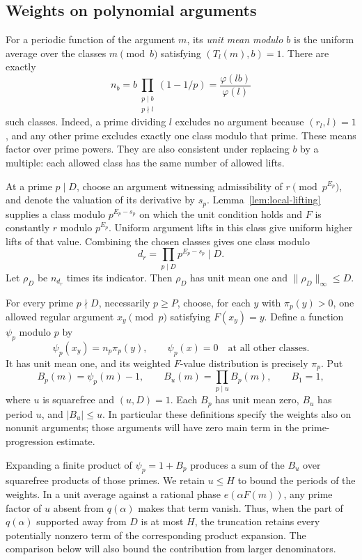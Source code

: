 \subsection{Weights on polynomial arguments}

For a periodic function of the argument $m$, its \emph{unit mean modulo
$b$} is the uniform average over the classes $m\pmod b$ satisfying
$(T_l(m),b)=1$.  There are exactly
\begin{equation}\label{eq:unit-mean-count}
 n_b=b\prod_{\substack{p\mid b\\p\nmid l}}(1-1/p)
     =\frac{\varphi(lb)}{\varphi(l)}
\end{equation}
such classes.  Indeed, a prime dividing $l$ excludes no argument because
$(r_l,l)=1$, and any other prime excludes exactly one class modulo that
prime.  These means factor over prime powers.  They are also consistent
under replacing $b$ by a multiple: each allowed class has the same number
of allowed lifts.

At a prime $p\mid D$, choose an argument witnessing admissibility of
$r\pmod {p^{E_p}}$, and denote the valuation of its derivative by $s_p$.
Lemma~\ref{lem:local-lifting} supplies a class modulo $p^{E_p-s_p}$ on
which the unit condition holds and $F$ is constantly $r$ modulo
$p^{E_p}$.  Uniform argument lifts in this class give uniform higher
lifts of that value.  Combining the chosen classes gives one class modulo
\[
 d_r=\prod_{p\mid D}p^{E_p-s_p}\mid D.
\]
Let $\rho_D$ be $n_{d_r}$ times its indicator.  Then $\rho_D$ has unit mean
one and $\|\rho_D\|_\infty\le D$.

For every prime $p\nmid D$, necessarily $p\ge P$, choose, for each $y$
with $\pi_p(y)>0$, one allowed regular argument $x_y\pmod p$ satisfying
$F(x_y)=y$.  Define a function $\psi_p$ modulo $p$ by
\[
 \psi_p(x_y)=n_p\pi_p(y),\qquad
 \psi_p(x)=0\quad\text{at all other classes}.
\]
It has unit mean one, and its weighted $F$-value distribution is precisely
$\pi_p$.  Put
\[
 B_p(m)=\psi_p(m)-1,\qquad
 B_u(m)=\prod_{p\mid u}B_p(m),\qquad B_1=1,
\]
where $u$ is squarefree and $(u,D)=1$.  Each $B_p$ has unit mean zero,
$B_u$ has period $u$, and $|B_u|\le u$.  In particular these definitions
specify the weights also on nonunit arguments; those arguments will have
zero main term in the prime-progression estimate.

Expanding a finite product of $\psi_p=1+B_p$ produces a sum of the $B_u$
over squarefree products of those primes.  We retain $u\le H$ to bound
the periods of the weights.  In a unit average against a rational phase
$e(\alpha F(m))$, any prime factor of $u$ absent from $q(\alpha)$ makes
that term vanish.  Thus, when the part of $q(\alpha)$ supported away from
$D$ is at most $H$, the truncation retains every potentially nonzero term
of the corresponding product expansion.  The comparison below will also
bound the contribution from larger denominators.

